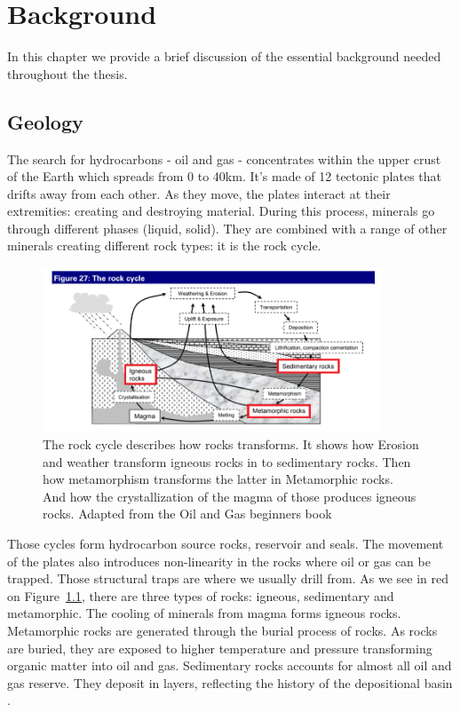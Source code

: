 \chapter{Background}
\label{chp:background}

In this chapter we provide a brief discussion of the essential background needed throughout the thesis. 


\section{Geology}
The search for hydrocarbons - oil and gas - concentrates within the upper crust of the Earth which spreads from 0 to 40km. It's made of 12 tectonic plates that drifts away from each other. As they move, the plates interact at their extremities: creating and destroying material. During this process, minerals go through different phases (liquid, solid). They are combined with a range of other minerals creating different rock types: it is the rock cycle. 
	\begin{figure}[!htp]
    \centering
        \includegraphics[width=0.9\textwidth]{figures/02-rock-cycle}
        \caption[The rock cycle]{The rock cycle describes how rocks transforms. It shows how Erosion and weather transform igneous rocks in to sedimentary rocks. Then how metamorphism transforms the latter in Metamorphic rocks. And how the crystallization of the magma of those produces igneous rocks. Adapted from the Oil and Gas beginners book \cite{oilbegin} }\label{fig:rock-cycle}
    \end{figure}

Those cycles form hydrocarbon source rocks, reservoir and seals. The movement of the plates also introduces non-linearity in the rocks where oil or gas can be trapped. Those structural traps are where we usually drill from. As we see in red on Figure~\ref{fig:rock-cycle}, there are three types of rocks: igneous, sedimentary and metamorphic. The cooling of minerals from magma  forms  igneous rocks. Metamorphic rocks are generated through  the burial process of rocks. As rocks are buried, they are exposed to higher temperature and pressure transforming organic matter into oil and gas. Sedimentary rocks accounts for almost all oil and gas reserve. They deposit in layers, reflecting the history of the depositional basin .


